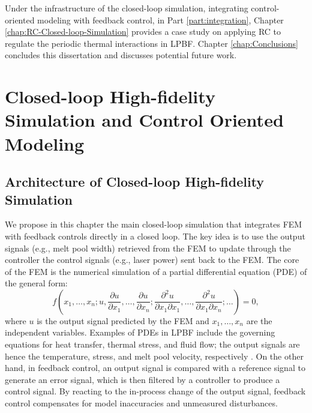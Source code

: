 \documentclass [11pt, proquest] {uwthesis}[2020/02/24]
\begin{document}
Under the infrastructure of the closed-loop simulation, integrating control-oriented modeling with feedback control, in Part \ref{part:integration}, Chapter \ref{chap:RC-Closed-loop-Simulation} provides a case study on applying RC to regulate the periodic thermal interactions in LPBF. Chapter \ref{chap:Conclusions} concludes this dissertation and discusses potential future work.


\part{Closed-loop High-fidelity Simulation and Control Oriented Modeling} \label{part:Closed-loop-Simulation}


\chapter{Architecture of Closed-loop High-fidelity Simulation} \label{chap:Closed-loop-Simulation}

We propose in this chapter the main closed-loop simulation that integrates
FEM with feedback controls directly in a closed loop. The key idea
is to use the output signals (e.g., melt pool width) retrieved from
the FEM to update through the controller the control signals (e.g.,
laser power) sent back to the FEM. The core of the FEM is the numerical
simulation of a partial differential equation (PDE) of the general
form:
\[
f(x_{1},\ldots,x_{n};u,\frac{\partial u}{\partial x_{1}},\ldots,\frac{\partial u}{\partial x_{n}};\frac{\partial^{2}u}{\partial x_{1}\partial x_{1}},\ldots,\frac{\partial^{2}u}{\partial x_{1}\partial x_{n}};\ldots)=0,
\]
where $u$ is the output signal predicted by the FEM and $x_{1},\ldots,x_{n}$
are the independent variables. Examples of PDEs in LPBF include the
governing equations for heat transfer, thermal stress, and fluid flow;
the output signals are hence the temperature, stress, and melt pool
velocity, respectively \cite{luo2018survey,mukherjee2018heat}. On
the other hand, in feedback control, an output signal is compared
with a reference signal to generate an error signal, which is then
filtered by a controller to produce a control signal. By reacting
to the in-process change of the output signal, feedback control compensates
for model inaccuracies and unmeasured disturbances.
\end{document}
